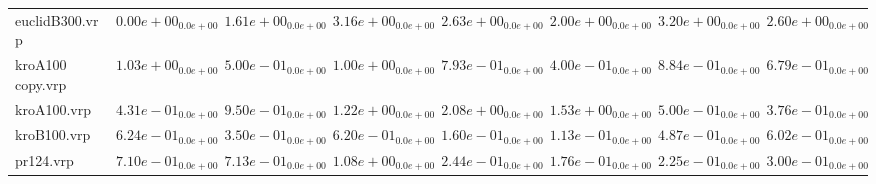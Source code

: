 \documentclass{article}
\begin{document}
\begin{table}
\begin{scriptsize}
\begin{tabular}{llllllll}
euclidB300.vrp & \cellcolor{gray95}$  0.00e+00_{ 0.0e+00}$ & \cellcolor{gray25}$  1.61e+00_{ 0.0e+00}$ & $  3.16e+00_{ 0.0e+00}$ & $  2.63e+00_{ 0.0e+00}$ & $  2.00e+00_{ 0.0e+00}$ & $  3.20e+00_{ 0.0e+00}$ & $  2.60e+00_{ 0.0e+00}$ \\
kroA100 copy.vrp & $  1.03e+00_{ 0.0e+00}$ & \cellcolor{gray25}$  5.00e-01_{ 0.0e+00}$ & $  1.00e+00_{ 0.0e+00}$ & $  7.93e-01_{ 0.0e+00}$ & \cellcolor{gray95}$  4.00e-01_{ 0.0e+00}$ & $  8.84e-01_{ 0.0e+00}$ & $  6.79e-01_{ 0.0e+00}$ \\
kroA100.vrp & \cellcolor{gray25}$  4.31e-01_{ 0.0e+00}$ & $  9.50e-01_{ 0.0e+00}$ & $  1.22e+00_{ 0.0e+00}$ & $  2.08e+00_{ 0.0e+00}$ & $  1.53e+00_{ 0.0e+00}$ & $  5.00e-01_{ 0.0e+00}$ & \cellcolor{gray95}$  3.76e-01_{ 0.0e+00}$ \\
kroB100.vrp & $  6.24e-01_{ 0.0e+00}$ & $  3.50e-01_{ 0.0e+00}$ & $  6.20e-01_{ 0.0e+00}$ & \cellcolor{gray25}$  1.60e-01_{ 0.0e+00}$ & \cellcolor{gray95}$  1.13e-01_{ 0.0e+00}$ & $  4.87e-01_{ 0.0e+00}$ & $  6.02e-01_{ 0.0e+00}$ \\
pr124.vrp & $  7.10e-01_{ 0.0e+00}$ & $  7.13e-01_{ 0.0e+00}$ & $  1.08e+00_{ 0.0e+00}$ & $  2.44e-01_{ 0.0e+00}$ & \cellcolor{gray95}$  1.76e-01_{ 0.0e+00}$ & \cellcolor{gray25}$  2.25e-01_{ 0.0e+00}$ & $  3.00e-01_{ 0.0e+00}$ \\
\hline
\end{tabular}
\end{scriptsize}
\end{table}
\end{document}
